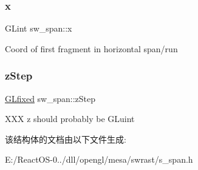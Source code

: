 \subsubsection{\texorpdfstring{x}{x}}
{\footnotesize\ttfamily G\+Lint sw\+\_\+span\+::x}

Coord of first fragment in horizontal span/run \mbox{\label{structsw__span_aa6b406baf2103831952be2f2ff4e535e}} 
\subsubsection{\texorpdfstring{z\+Step}{zStep}}
{\footnotesize\ttfamily \hyperlink{glheader_8h_ad6d3fa892df40dedf48ee6d84529ae5e}{G\+Lfixed} sw\+\_\+span\+::z\+Step}

X\+XX z should probably be G\+Luint 

该结构体的文档由以下文件生成\+:\begin{DoxyCompactItemize}
\item 
E\+:/\+React\+O\+S-\/0../dll/opengl/mesa/swrast/s\+\_\+span.\+h\end{DoxyCompactItemize}
